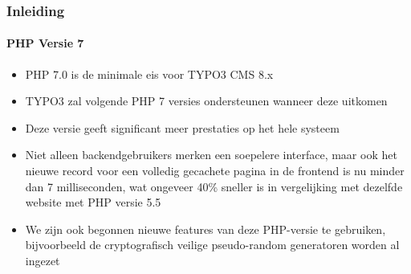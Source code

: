 \begin{frame}[fragile]
	\frametitle{Inleiding}
	\framesubtitle{PHP Versie 7}

	\begin{itemize}

		\item PHP 7.0 is de minimale eis voor TYPO3 CMS 8.x
		\item TYPO3 zal volgende PHP 7 versies ondersteunen wanneer deze uitkomen
		\item Deze versie geeft significant meer prestaties op het hele systeem

		\item Niet alleen backendgebruikers merken een soepelere interface, maar ook het
			nieuwe record voor een volledig gecachete pagina in de frontend is nu minder
			dan 7 milliseconden, wat ongeveer 40\% sneller is in vergelijking met dezelfde
			website met PHP versie 5.5

		\item We zijn ook begonnen nieuwe features van deze PHP-versie te gebruiken, bijvoorbeeld
			de cryptografisch veilige pseudo-random generatoren worden al ingezet

	\end{itemize}

\end{frame}

